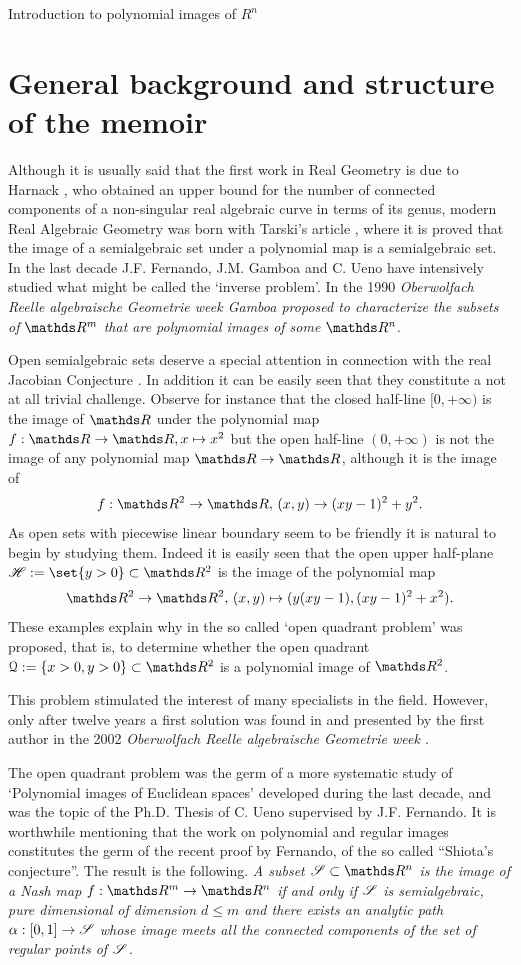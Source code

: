 \documentclass[11pt, a4paper, english, twoside, notitlepage, openright]{report}
\begin{document}
\begin{chapter}{Introduction to polynomial images of $R^n$}

\section{General background and structure of the memoir}

Although it is usually said that the first work in Real Geometry is due to Harnack \cite{h}, who obtained an upper bound for the number of connected components of a non-singular real algebraic curve in terms of its genus, modern Real Algebraic Geometry was born with Tarski's article \cite{ta}, where it is proved that the image of a semialgebraic set under a polynomial map is a semialgebraic set. In the last decade J.F. Fernando, J.M. Gamboa and C. Ueno have intensively studied  what might be called the `inverse problem'. In the 1990 \em Oberwolfach Reelle algebraische Geometrie \em week \cite{g} Gamboa proposed to characterize the subsets of $\R^m$ that are polynomial images of some $\R^n$. 

Open semialgebraic sets deserve a special attention in connection with the real Jacobian Conjecture \cite{p}. In addition it can be easily seen that they constitute a not at all trivial challenge. Observe for instance that the closed half-line $[0,+\infty)$ is the image of $\R$ under the polynomial map $f:\R\to\R, x\mapsto x^2$ but the open half-line $(0,+\infty)$ is not the image of any polynomial map $\R\to\R$, although it is the image of 
$$
f:\R^2\to\R,\, (x,y)\to (xy-1)^2+y^2.
$$ 
As open sets with piecewise linear boundary seem to be friendly it is natural to begin by studying them. Indeed it is easily seen that the open upper half-plane $\H:=\set{y>0}\subset\R^2$ is the image of the polynomial map 
$$
\R^2\to\R^2,\, (x,y)\mapsto (y(xy-1),(xy-1)^2+x^2).
$$
These examples explain why in \cite{g} the so called `open quadrant problem' was proposed, that is, to determine whether the open quadrant $\Qu:=\{x>0,y>0\}\subset\R^2$ is a polynomial image of $\R^2$.

This problem stimulated the interest of many specialists in the field. However, only after twelve years a first solution was found in \cite{fg} and presented by the first author in the 2002 \em Oberwolfach Reelle algebraische Geometrie \em week \cite{fe}.

The open quadrant problem was the germ of a more systematic study of `Polynomial images of Euclidean spaces' developed  during the last decade, and was the topic of the Ph.D. Thesis of C. Ueno \cite{u} supervised by J.F. Fernando. It is worthwhile mentioning that the work on polynomial and regular images constitutes the germ of the recent proof by Fernando, \cite{f1} of the so called ``Shiota's conjecture''. The result is the following.  \em A subset $\Ss\subset\R^n$ is the image of a Nash map $f:\R^m\to\R^n$ if and only if $\mathscr{S}$ is semialgebraic, pure dimensional of dimension $d\leq m$ and there exists an analytic path $\alpha:[0,1]\to\mathscr{S}$ whose image meets all the connected components of the set of regular points of $\mathscr{S}$\em. 


\end{chapter}
\end{document}
